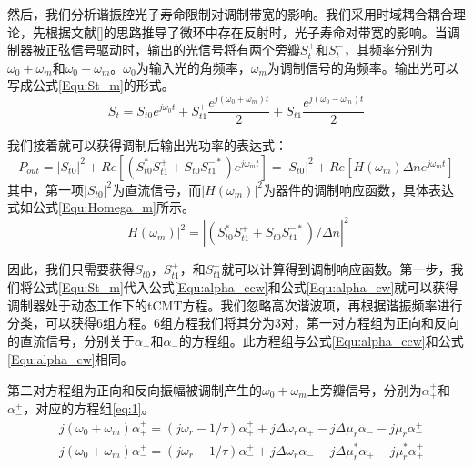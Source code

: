 然后，我们分析谐振腔光子寿命限制对调制带宽的影响。我们采用时域耦合耦合理论，先根据文献[]的思路推导了微环中存在反射时，光子寿命对带宽的影响。当调制器被正弦信号驱动时，输出的光信号将有两个旁瓣$S_{t}^+$和$S_{t}^-$，其频率分别为$\omega_0+\omega_m$和$\omega_0-\omega_m$。$\omega_0$为输入光的角频率，$\omega_m$为调制信号的角频率。输出光可以写成公式\ref{Equ:St_m}的形式。
\begin{equation}
\label{Equ:St_m}
S_t = S_{t0}e^{j\omega_0t}+S_{t1}^+\frac{e^{j(\omega_0+\omega_m)t}}{2}+S_{t1}^-\frac{e^{j(\omega_0-\omega_m)t}}{2}
\end{equation}

我们接着就可以获得调制后输出光功率的表达式：
\begin{equation}
\label{Equ:Pout_m}
P_{out} = |S_{t0}|^2+Re\left[(S_{t0}^*S_{t1}^{+}+S_{t0}S_{t1}^{-*})e^{j\omega_mt} \right]=|S_{t0}|^2+Re\left[H(\omega_m)\Delta n e^{j\omega_mt}\right]
\end{equation}
其中，第一项$|S_{t0}|^2$为直流信号，而$|H(\omega_m)|^2$为器件的调制响应函数，具体表达式如公式\ref{Equ:Homega_m}所示。
\begin{equation}
\label{Equ:Homega_m}
 |H(\omega_m)|^2 = |(S_{t0}^*S_{t1}^{+}+S_{t0}S_{t1}^{-*})/\Delta n|^2 
\end{equation}

因此，我们只需要获得$S_{t0}$，$S_{t1}^+$，和$S_{t1}^-$就可以计算得到调制响应函数。第一步，我们将公式\ref{Equ:St_m}代入公式\ref{Equ:alpha_ccw}和公式\ref{Equ:alpha_cw}就可以获得调制器处于动态工作下的tCMT方程。我们忽略高次谐波项，再根据谐振频率进行分类，可以获得6组方程。6组方程我们将其分为3对，第一对方程组为正向和反向的直流信号，分别关于$\alpha_+$和$\alpha_-$的方程组。此方程组与公式\ref{Equ:alpha_ccw}和公式\ref{Equ:alpha_cw}相同。

第二对方程组为正向和反向振幅被调制产生的$\omega_0+\omega_m$上旁瓣信号，分别为$\alpha_+^+$和$\alpha_-^+$，对应的方程组\ref{eq:1}。
\begin{subequations}  \label{eq:1}
	\begin{align}  
	&j(\omega_0+\omega_m)\alpha_+^+ = (j\omega_r-1/\tau)\alpha_+^+ +j\Delta \omega_r\alpha_+ - j\Delta \mu_r\alpha_- - j\mu_r\alpha_-^+            \label{eq:1A} \\
	&j(\omega_0+\omega_m)\alpha_-^+ = (j\omega_r-1/\tau)\alpha_-^+ +j\Delta \omega_r\alpha_- - j\Delta \mu_r^*\alpha_+ - j\mu_r^*\alpha_+^+           \label{eq:1B}
	\end{align}
\end{subequations}

